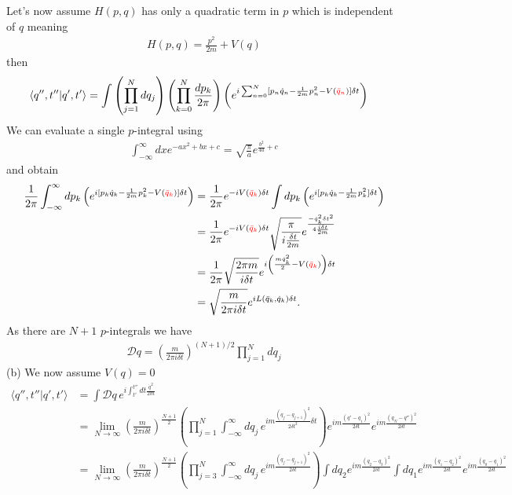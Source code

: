 \documentclass[10pt,a4paper]{book}
\theoremstyle{definition}
\begin{document}
Let's now assume $H(p,q)$ has only a quadratic term in $p$ which is independent of $q$ meaning
\begin{align}
    H(p,q)=\frac{p^2}{2m}+V(q)
\end{align}
then
\begin{align}
\langle q'',t''|q',t'\rangle
        &=\int\left(\prod_{j=1}^N dq_j\right)\left(\prod_{k=0}^{N}\frac{dp_k}{2\pi}\right) \left(e^{i\sum_{n=0}^N[p_n\dot{q}_n-\frac{1}{2m}p_n^2-V(\textcolor{red}{\bar{q}_n})]\delta t}\right)
\end{align}
We can evaluate a single $p$-integral using
\begin{align}
    \int_{-\infty}^\infty dx e^{-ax^2+bx+c}=\sqrt{\frac{\pi}{a}}e^{\frac{b^2}{4a}+c}
\end{align}
and obtain
\begin{align}
        \frac{1}{2\pi}\int_{-\infty}^\infty dp_k \left(e^{i[p_k\dot{q}_k-\frac{1}{2m}p_k^2-V(\textcolor{red}{\bar{q}_k})]\delta t}\right)
        &=\frac{1}{2\pi}e^{-iV(\textcolor{red}{\bar{q}_k})\delta t}\int dp_k \left(e^{i[p_k\dot{q}_k-\frac{1}{2m}p_k^2]\delta t}\right)\\
        &=\frac{1}{2\pi}e^{-iV(\textcolor{red}{\bar{q}_k})\delta t}\sqrt{\frac{\pi}{i\frac{\delta t}{2m}}} e^{\frac{-\dot{q}_k^2\delta t^2}{4\frac{i\delta t}{2m}}}\\
        &=\frac{1}{2\pi}\sqrt{\frac{2\pi m}{i\delta t}} e^{i\left(\frac{m\dot{q}_k^2}{2}-V(\textcolor{red}{\bar{q}_k})\right)\delta t}\\
        &=\sqrt{\frac{m}{2\pi i\delta t}} e^{iL(\bar{q}_k,\dot{q}_k)\delta t}.
\end{align}
As there are $N+1$ $p$-integrals we have
\begin{align}
    \mathcal{D}q=\left(\frac{m}{2\pi i\delta t}\right)^{(N+1)/2}\prod_{j=1}^N dq_j
\end{align}
(b) We now assume $V(q)=0$
\begin{align}
\langle q'',t''|q',t'\rangle
&=\int\mathcal{D}q\,e^{i\int_{t'}^{t''}dt\frac{\dot{q}^2}{2m}}\\
&=\lim_{N\rightarrow\infty}\left(\frac{m}{2\pi i\delta t}\right)^\frac{N+1}{2}\left(\prod_{j=1}^N \int_{-\infty}^{\infty}dq_j\, e^{im\frac{(q_j-q_{j+1})^2}{2\delta t^2}\delta t}\right)e^{im\frac{(q'-q_1)^2}{2\delta t}}e^{im\frac{(q_N-q'')^2}{2\delta t}}\\
&=\lim_{N\rightarrow\infty}\left(\frac{m}{2\pi i\delta t}\right)^\frac{N+1}{2}\left(\prod_{j=3}^N \int_{-\infty}^{\infty}dq_j\, e^{im\frac{(q_j-q_{j+1})^2}{2\delta t}}\right)\int dq_2e^{im\frac{(q_2-q_3)^2}{2\delta t}}\int dq_1e^{im\frac{(q_1-q_2)^2}{2\delta t}}e^{im\frac{(q_0-q_1)^2}{2\delta t}}
\end{align}
\end{document}
